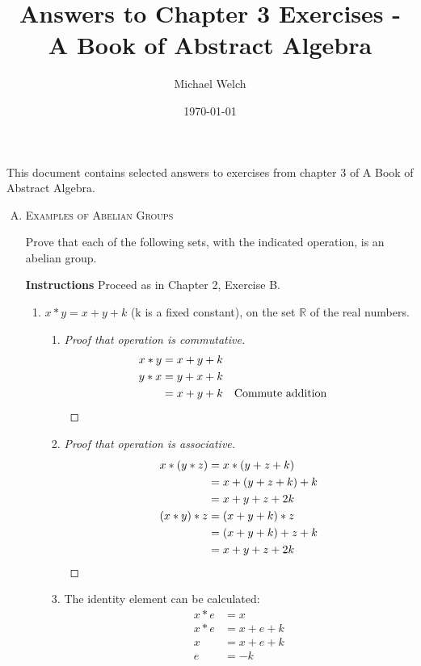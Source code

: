 \documentclass[twoside]{amsart}
\newcommand{\Reals}{\mathbb{R}{}}
\begin{document}
\title{Answers to Chapter 3 Exercises - A Book of Abstract Algebra}
\author{Michael Welch}
\date{\today}
\maketitle

This document contains selected answers to exercises from chapter 3
of A Book of Abstract Algebra.

\begin{enumerate}[A.]
   \item \textsc{Examples of Abelian Groups}

   Prove that each of the following sets, with the indicated operation, is an
   abelian group.

   \textbf{Instructions} Proceed as in Chapter 2, Exercise B.

   \begin{enumerate}[1.]
      \item $x * y = x + y + k$ (k is a fixed constant), on the set 
      $\Reals$ of the real numbers.

      \begin{enumerate} %
	 \item 
	 \begin{proof}[Proof that operation is commutative]
	    \begin{align*}
	       x * y & = x + y + k \\
	       y * x & = y + x + k \\
		     & = x + y + k && \text{Commute addition} \qedhere
	    \end{align*}
	 \end{proof}

	 \item 
	 \begin{proof}[Proof that operation is associative]
	    \begin{align*}
	       x * (y * z) & = x * (y + z + k) \\
			   & = x + (y + z + k) + k \\
			   & = x + y + z + 2k \\
	       (x * y) * z & = (x + y + k) * z \\
			   & = (x + y + k) + z + k \\
			   & = x + y + z + 2k \qedhere
	    \end{align*}
	 \end{proof}

	 \item The identity element can be calculated:
	 \begin{align*}
	    x * e & = x         \\
	    x * e & = x + e + k \\
		x & = x + e + k \\
		e & = -k
	 \end{align*}


\end{enumerate}
\end{enumerate}
\end{enumerate}
\end{document}
